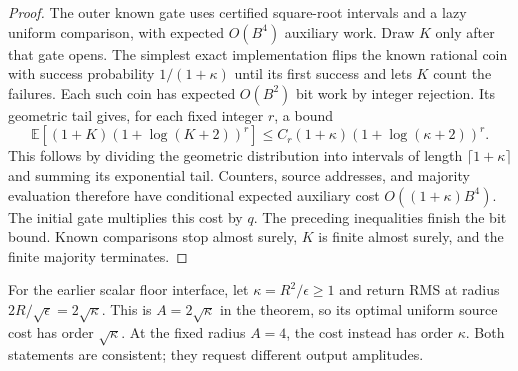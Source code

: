 \begin{proof}
The outer known gate uses certified square-root intervals and a lazy
uniform comparison, with expected $O(B^4)$ auxiliary work.  Draw $K$
only after that gate opens.  The simplest exact implementation flips the known rational coin
with success probability $1/(1+\kappa)$ until its first success
and lets $K$ count the failures.  Each such coin has expected
$O(B^2)$ bit work by integer rejection.  Its geometric tail gives,
for each fixed integer $r$, a bound
\[
 \mathbb E[(1+K)(1+\log(K+2))^r]
 \le C_r(1+\kappa)(1+\log(\kappa+2))^r.
\]
This follows by dividing the geometric distribution into intervals
of length $\lceil1+\kappa\rceil$ and summing its exponential tail.
Counters, source addresses, and majority evaluation therefore have
conditional expected auxiliary cost $O((1+\kappa)B^4)$.  The initial
gate multiplies this cost by $q$.  The preceding inequalities finish
the bit bound.  Known comparisons stop almost surely, $K$ is finite
almost surely, and the finite majority terminates.
\end{proof}

For the earlier scalar floor interface, let $\kappa=R^2/\epsilon\ge1$
and return RMS at radius $2R/\sqrt\epsilon=2\sqrt\kappa$.
This is $A=2\sqrt\kappa$ in the theorem, so its optimal uniform
source cost has order $\sqrt\kappa$.  At the fixed radius $A=4$, the
cost instead has order $\kappa$.  Both statements are consistent;
they request different output amplitudes.
